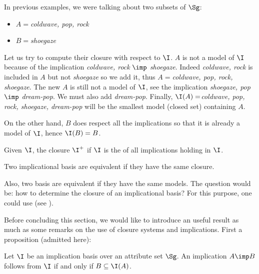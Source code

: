 \noindent In previous examples, we were talking about two subsets of $\Sg$:
\begin{itemize}
	\item $ A = $\textit{coldwave, pop, rock}
	\item $B = $\textit{shoegaze}
\end{itemize}

\noindent Let us try to compute their closure with respect to $\I$. $A$ is not
a model of $\I$ because of the implication \textit{coldwave, rock}  $\imp$ 
\textit{shoegaze}.  Indeed \textit{coldwave, rock} is included in $A$ but not
\textit{shoegaze} so we add it, thus $A = $\textit{coldwave, pop, 
rock, shoegaze}. The new $A$ is still not a model of $\I$, see the implication
\textit{shoegaze, pop} $\imp$ \textit{dream-pop}. We must also add 
\textit{dream-pop}. Finally, $\I(A) = $\textit{coldwave, pop, rock, 
shoegaze, dream-pop} will be the smallest model (closed set) containing $A$.

On the other hand, $B$ does respect all the implications so that it is already 
a model of $\I$, hence $\I(B) = B$.

\vspace{1.2em}

\begin{definition} Given $\I$, the
closure $\I^+$ if $\I$ is the of all implications holding in $\I$.
	
\end{definition}

\begin{definition} Two implicational
basis are equivalent if they have the same closure.
	
\end{definition}

\noindent Also, two basis are equivalent if they have the same models. The 
question would be: how to determine the closure of an implicational basis? For
this purpose, one could use  (see 
\cite{b._ganter_conceptual_2016, maier_theory_1983}).

\vspace{1.2em}

Before concluding this section, we would like to introduce an useful result as
much as some remarks on the use of closure systems and implications. First 
a proposition (admitted here):

\begin{proposition} \label{prop:def.equiv_imp_clos} 
Let $\I$ be an implication basis over an attribute set $\Sg$. An implication $A 
\imp B$ follows from $\I$ if and only if $B \subseteq \I(A)$.
\end{proposition}

